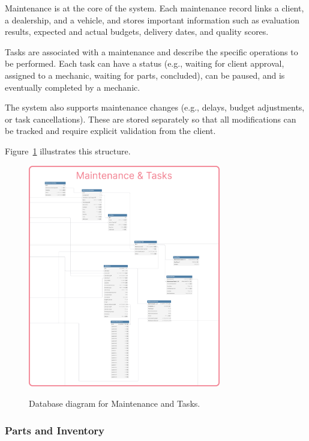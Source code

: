 Maintenance is at the core of the system. Each maintenance record links a client, a dealership, and a vehicle, and stores important information such as evaluation results, expected and actual budgets, delivery dates, and quality scores.

Tasks are associated with a maintenance and describe the specific operations to be performed. Each task can have a status (e.g., waiting for client approval, assigned to a mechanic, waiting for parts, concluded), can be paused, and is eventually completed by a mechanic.

The system also supports maintenance changes (e.g., delays, budget adjustments, or task cancellations). These are stored separately so that all modifications can be tracked and require explicit validation from the client.

Figure~\ref{fig:dbMaintenance} illustrates this structure.

\begin{figure}[h]
  \caption{Database diagram for Maintenance and Tasks.}
  \centering
  \includegraphics[width=0.75\textwidth]{figs/dbDiagrams/Maintenance_and_Tasks}
  \label{fig:dbMaintenance}
\end{figure}



\subsubsection{Parts and Inventory} 



